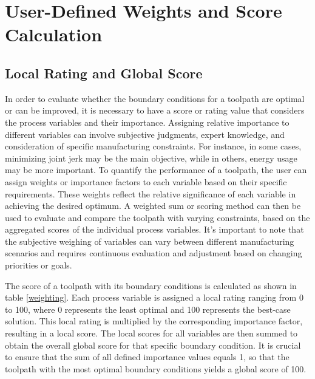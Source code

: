 \section{User-Defined Weights and Score Calculation}\label{weights}
\subsection{Local Rating and Global Score}\label{LR}
In order to evaluate whether the boundary conditions for a toolpath are optimal or can be improved, it is necessary to have a score or rating value that considers the process variables and their importance. Assigning relative importance to different variables can involve subjective judgments, expert knowledge, and consideration of specific manufacturing constraints. For instance, in some cases, minimizing joint jerk may be the main objective, while in others, energy usage may be more important. To quantify the performance of a toolpath, the user can assign weights or importance factors to each variable based on their specific requirements. These weights reflect the relative significance of each variable in achieving the desired optimum. A weighted sum or scoring method can then be used to evaluate and compare the toolpath with varying constraints, based on the aggregated scores of the individual process variables. %
It's important to note that the subjective weighing of variables can vary between different manufacturing scenarios and requires continuous evaluation and adjustment based on changing priorities or goals.

The score of a toolpath with its boundary conditions is calculated as shown in table \ref{weighting}. Each process variable is assigned a local rating ranging from 0 to 100, where 0 represents the least optimal and 100 represents the best-case solution. This local rating is multiplied by the corresponding importance factor, resulting in a local score. The local scores for all variables are then summed to obtain the overall global score for that specific boundary condition. It is crucial to ensure that the sum of all defined importance values equals 1, so that the toolpath with the most optimal boundary conditions yields a global score of 100.

